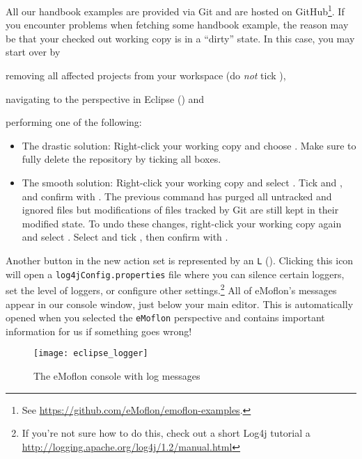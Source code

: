 \begin{stepbystep}
All our handbook examples are provided via Git and are hosted on GitHub\footnote{See \url{https://github.com/eMoflon/emoflon-examples}.}.
If you encounter problems when fetching some handbook example, the reason may be that your checked out working copy is in a \enquote{dirty} state.
In this case, you may start over by 
\begin{inparaenum}
\item removing all affected projects from your workspace (do \emph{not} tick ),
\item navigating to the  perspective in Eclipse () and
\item performing one of the following:
\end{inparaenum}
\begin{itemize}
\item The drastic solution:
Right-click your working copy \eMoflonExamplesRepo and choose .
Make sure to fully delete the repository by ticking all boxes.
\item The smooth solution:
Right-click your working copy \eMoflonExamplesRepo and select .
Tick  and , and confirm with .
The previous command has purged all untracked and ignored files but modifications of files tracked by Git are still kept in their modified state.
To undo these changes, right-click your working \eMoflonExamplesRepo copy again and select .
Select  and tick , then confirm with .
\end{itemize}


\item
Another button in the new action set is  represented by an \texttt{L} ().
Clicking this icon will open a \texttt{log4jConfig\-.properties} file where you can silence certain loggers, set the level of loggers, or configure other
settings.\footnote{If you're not sure how to do this, check out a short Log4j tutorial a \url{http://logging.apache.org/log4j/1.2/manual.html}} All of eMoflon's
messages appear in our console window, just below your main editor. This is automatically opened when you selected the \texttt{eMoflon} perspective and
contains important information for us if something goes wrong!

\begin{figure}[htbp]
	\centering
  \texttt{[image: eclipse\_logger]}
	\caption{The eMoflon console with log messages}
	\label{eclipse:logger}
\end{figure} 
\end{stepbystep}



